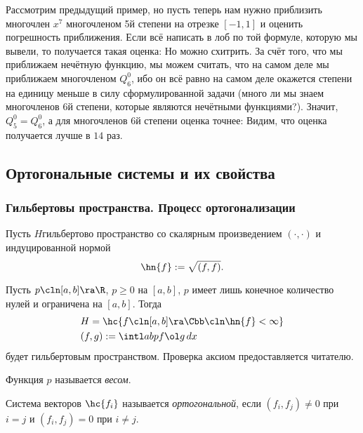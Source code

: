 \documentclass[a4paper]{article}
\begin{document}
\begin{ex}
Рассмотрим предыдущий пример, но пусть теперь нам нужно приблизить многочлен $x^7$
многочленом 5\д й степени на отрезке $[-1,1]$ и оценить погрешность приближения. Если всё написать в лоб
по той формуле, которую мы вывели, то получается такая оценка:
Но можно схитрить. За счёт того, что мы приближаем нечётную функцию,
мы можем считать, что на самом деле мы приближаем многочленом $Q_6^0$, ибо
он всё равно на самом деле окажется степени на единицу меньше в силу сформулированной задачи
(много ли мы знаем многочленов 6\д й степени, которые являются нечётными функциями?).
Значит, $Q_5^0 = Q_6^0$, а для многочленов 6\д й степени оценка точнее:
Видим, что оценка получается лучше в $14$ раз.
\end{ex}


\subsection{Ортогональные системы и их свойства}

\subsubsection{Гильбертовы пространства. Процесс ортогонализации}

Пусть $H$\т гильбертово пространство со скалярным произведением $(\cdot,\cdot)$ и индуцированной нормой
$$\hn{f} := \sqrt{(f,f)}.$$

Пусть $p\cln [a,b] \ra \R$, $p \ge 0$ на $[a,b]$, $p$ имеет лишь конечное количество нулей
и ограничена на $[a,b]$. Тогда
$$
\begin{aligned}
&H = \hc{f \cln [a,b] \ra \Cbb\cln \hn{f} < \infty}\\
&(f,g) := \intl ab p f \ol g\, dx
\end{aligned}
$$
будет гильбертовым пространством. Проверка аксиом предоставляется читателю.

\begin{df}
Функция $p$ называется \emph{весом}.
\end{df}

\begin{df}
Система векторов $\hc{f_i}$ называется \emph{ортогональной}, если $(f_i,f_j) \neq 0$ при $i = j$ и $(f_i,f_j) = 0$ при $i \neq j$.
\end{df}
\end{document}
